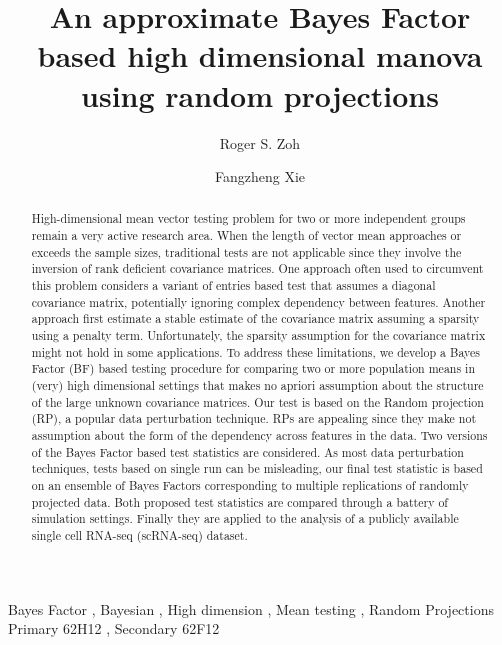 \documentclass[times,sort&compress,3p]{elsarticle}
\theoremstyle{plain}%
\theoremstyle{definition}
\begin{document}
\begin{frontmatter}

\title{An approximate Bayes Factor based high dimensional manova using random projections}

\author[1]{Roger S. Zoh }
\author[2]{Fangzheng Xie}

\address[1]{Department of Epidemiology \& Biostatistics Indiana University, Bloomington, IN 47405, USA}
\address[2]{Department of Statistics Indiana University, Bloomington, IN 47405, USA}


\begin{abstract}
High-dimensional mean vector testing problem for two or more independent groups remain a very active research area. When the length of vector mean approaches or exceeds the sample sizes, traditional tests are not applicable since they involve the inversion of rank deficient covariance matrices. One approach often used to circumvent this problem considers a variant of entries based test that assumes a diagonal covariance matrix, potentially ignoring complex dependency between features. Another approach first estimate a stable estimate of the covariance matrix assuming a sparsity using a penalty term. Unfortunately, the sparsity assumption for the covariance matrix might not hold in some applications.   
To address these limitations, we develop a Bayes Factor (BF) based testing procedure for comparing two or more population means in (very) high dimensional settings that makes no apriori assumption about the structure of the large unknown covariance matrices. Our test is based on the Random projection (RP), a popular data perturbation technique. RPs are appealing since they make not assumption about the form of the dependency across features in the data. Two versions of the Bayes Factor based test statistics are considered. As most data perturbation techniques, tests based on single run can be misleading, our  final test statistic is based on an ensemble of Bayes Factors corresponding to multiple replications of randomly projected data. Both proposed test statistics are compared through a battery of simulation settings. Finally they are applied to the analysis of a publicly available single cell RNA-seq (scRNA-seq) dataset. 
\end{abstract}

\begin{keyword} %
Bayes Factor \sep
Bayesian \sep
High dimension \sep
Mean testing \sep
Random Projections 
\MSC[2020] Primary 62H12 \sep
Secondary 62F12
\end{keyword}

\end{frontmatter}
\end{document}
